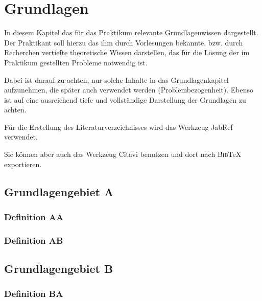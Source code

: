 \documentclass[oneside]{ausarbeitung}
\begin{document}
\chapter{Grundlagen}
\label{cha:grundlagen}

In diesem Kapitel das für das Praktikum relevante Grundlagenwissen 
dargestellt. Der Praktikant soll hierzu das ihm durch Vorlesungen 
bekannte, bzw. durch Recherchen vertiefte theoretische Wissen 
darstellen, das für die Lösung der im Praktikum gestellten Probleme 
notwendig ist.

Dabei ist darauf zu achten, nur solche Inhalte in das Grundlagenkapitel 
aufzunehmen, die später auch verwendet werden (Problembezogenheit). 
Ebenso ist auf eine ausreichend tiefe und vollständige Darstellung der 
Grundlagen zu achten.

Für die Erstellung des Literaturverzeichnisses 
wird das Werkzeug JabRef\autocite{JabRef:JabRef} verwendet. 

Sie können aber auch das Werkzeug Citavi\autocite{SAS:Citavi} benutzen
und dort nach \textsc{Bib}\TeX{} exportieren.

\section{Grundlagengebiet A}
\label{sec:grundlagengebieta}

\blindtext

\subsection{Definition AA}
\label{sub:definitionaa}

\blindtext

\subsection{Definition AB}
\label{sub:definitionab}

\blindtext

\section{Grundlagengebiet B}
\label{sec:grundlagengebietb}

\blindtext

\subsection{Definition BA}
\label{sub:definitionBa}
\end{document}
